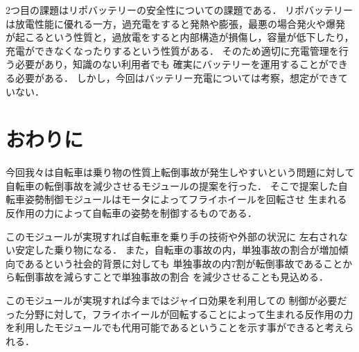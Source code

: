 \documentclass[uplatex,dvipdfmx]{jsarticle}
\begin{document}
2つ目の課題はリポバッテリーの安全性についての課題である．
リポバッテリーは放電性能に優れる一方，過充電をすると発熱や膨張，最悪の場合発火や爆発
が起こるという性質と，過放電をすると内部構造が損傷し，容量が低下したり，
充電ができなくなったりするという性質がある．
そのため適切に充電管理を行う必要があり，知識のない利用者でも
確実にバッテリーを運用することができる必要がある．
しかし，今回はバッテリー充電については考察，想定ができていない．

\section{おわりに}

今回我々は自転車は乗り物の性質上転倒事故が発生しやすいという問題に対して
自転車の転倒事故を減少させるモジュールの提案を行った．
そこで提案した自転車姿勢制御モジュールはモータによってフライホイールを回転させ
生まれる反作用の力によって自転車の姿勢を制御するものである．

このモジュールが実現すれば自転車を乗り手の技術や外部の状況に
左右されない安定した乗り物になる．
また，自転車の事故の内，単独事故の割合が増加傾向であるという社会的背景に対しても
単独事故の内7割が転倒事故であることから転倒事故を減らすことで単独事故の割合
を減少させることも見込める．

このモジュールが実現すれば今まではジャイロ効果を利用しての
制御が必要だった分野に対して，フライホイールが回転することによって生まれる反作用の力
を利用したモジュールでも代用可能であるということを示す事ができると考えられる．
\end{document}

